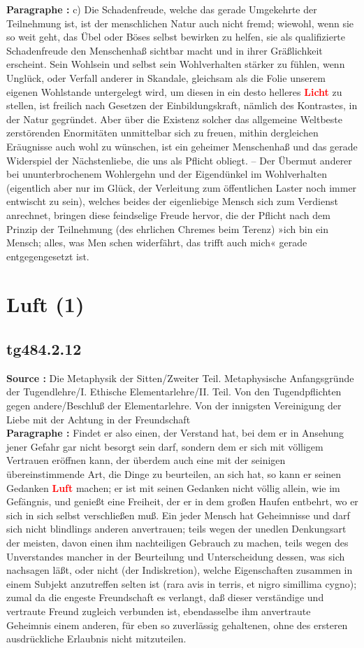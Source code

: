 \documentclass[a4paper,12pt,twoside]{book}
\newcommand{\match}[1]{\textcolor{red}{\textbf{#1}}}
\newcommand{\unnumberedsection}[1]{
	\section*{#1}
	\addcontentsline{toc}{section}{#1}
	\markright{#1}
}
\begin{document}
	\textbf{Paragraphe : }c) Die Schadenfreude, welche das gerade Umgekehrte der Teilnehmung ist, ist der menschlichen Natur auch nicht fremd; wiewohl, wenn sie so weit geht, das Übel oder Böses selbst bewirken zu helfen, sie als qualifizierte Schadenfreude den Menschenhaß sichtbar macht und in ihrer Gräßlichkeit erscheint. Sein Wohlsein und selbst sein Wohlverhalten stärker zu fühlen, wenn Unglück, oder Verfall  anderer in Skandale, gleichsam als die Folie unserem eigenen Wohlstande untergelegt wird, um diesen in ein desto helleres \match{Licht} zu stellen, ist freilich nach Gesetzen der Einbildungskraft, nämlich des Kontrastes, in der Natur gegründet. Aber über die Existenz solcher das allgemeine Weltbeste zerstörenden Enormitäten unmittelbar sich zu freuen, mithin dergleichen Eräugnisse auch wohl zu wünschen, ist ein geheimer Menschenhaß und das gerade Widerspiel der Nächstenliebe, die uns als Pflicht obliegt. – Der Übermut anderer bei ununterbrochenem Wohlergehn und der Eigendünkel im Wohlverhalten (eigentlich aber nur im Glück, der Verleitung zum öffentlichen Laster noch immer entwischt zu sein), welches beides der eigenliebige Mensch sich zum Verdienst anrechnet, bringen diese feindselige Freude hervor, die der Pflicht nach dem Prinzip der Teilnehmung (des ehrlichen Chremes beim Terenz) »ich bin ein Mensch; alles, was Men schen widerfährt, das trifft auch mich« gerade entgegengesetzt ist. 
	
	\unnumberedsection{Luft (1)} 
	\subsection*{tg484.2.12} 
	\textbf{Source : }Die Metaphysik der Sitten/Zweiter Teil. Metaphysische Anfangsgründe der Tugendlehre/I. Ethische Elementarlehre/II. Teil. Von den Tugendpflichten gegen andere/Beschluß der Elementarlehre. Von der innigsten Vereinigung der Liebe mit der Achtung in der Freundschaft\\  
	
	\textbf{Paragraphe : }Findet er also einen, der Verstand hat, bei dem er in Ansehung jener Gefahr gar nicht besorgt sein darf, sondern  dem er sich mit völligem Vertrauen eröffnen kann, der überdem auch eine mit der seinigen übereinstimmende Art, die Dinge zu beurteilen, an sich hat, so kann er seinen Gedanken \match{Luft} machen; er ist mit seinen Gedanken nicht völlig allein, wie im Gefängnis, und genießt eine Freiheit, der er in dem großen Haufen entbehrt, wo er sich in sich selbst verschließen muß. Ein jeder Mensch hat Geheimnisse und darf sich nicht blindlings anderen anvertrauen; teils wegen der unedlen Denkungsart der meisten, davon einen ihm nachteiligen Gebrauch zu machen, teils wegen des Unverstandes mancher in der Beurteilung und Unterscheidung dessen, was sich nachsagen läßt, oder nicht (der Indiskretion), welche Eigenschaften zusammen in einem Subjekt anzutreffen selten ist (rara avis in terris, et nigro simillima cygno); zumal da die engeste Freundschaft es verlangt, daß dieser verständige und vertraute Freund zugleich verbunden ist, ebendasselbe ihm anvertraute Geheimnis einem anderen, für eben so zuverlässig gehaltenen, ohne des ersteren ausdrückliche Erlaubnis nicht mitzuteilen. 
	
\end{document}
